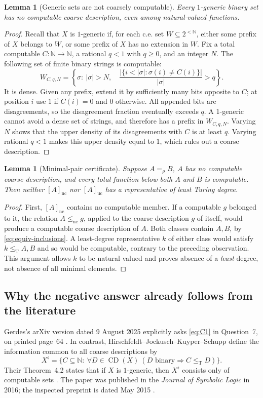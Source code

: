 \documentclass[11pt,a4paper]{article}
\newcommand{\N}{\mathbb N}
\newcommand{\strings}{2^{<\N}}
\newcommand{\leT}{\leq_{\mathrm T}}
\newcommand{\CD}{\operatorname{CD}}
\newcommand{\nc}{\mathrm{nc}}
\newcommand{\uc}{\mathrm{uc}}
\newtheorem{lemma}[theorem]{Lemma}
\theoremstyle{definition}\newtheorem{definition}[theorem]{Definition}
\theoremstyle{remark}\newtheorem{remark}[theorem]{Remark}
\begin{document}
\begin{lemma}[Generic sets are not coarsely computable]\label{lem:generic}
Every $1$-generic binary set has no computable coarse description, even among
natural-valued functions.
\end{lemma}
\begin{proof}
Recall that $X$ is $1$-generic if, for each c.e. set $W\subseteq\strings$,
either some prefix of $X$ belongs to $W$, or some prefix of $X$ has no
extension in $W$.
Fix a total computable $C:\N\to\N$, a rational $q<1$ with $q\ge0$, and an
integer $N$. The following set of finite binary strings is computable:
\[
 W_{C,q,N}=\left\{\sigma:\ |\sigma|>N,
 \quad\frac{|\{i<|\sigma|:\sigma(i)\ne C(i)\}|}{|\sigma|}>q\right\}.
\]
It is dense. Given any prefix, extend it by sufficiently many bits opposite
to $C$; at position $i$ use $1$ if $C(i)=0$ and $0$ otherwise. All appended
bits are disagreements, so the disagreement fraction eventually exceeds $q$.
A $1$-generic cannot avoid a dense set of strings, and therefore has a prefix
in $W_{C,q,N}$. Varying $N$ shows that the upper density of its disagreements
with $C$ is at least $q$. Varying rational $q<1$ makes this upper density equal
to $1$, which rules out a coarse description.
\end{proof}

\begin{lemma}[Minimal-pair certificate]\label{lem:certificate}
Suppose $A=_{\rho}B$, $A$ has no computable coarse description, and every total
function below both $A$ and $B$ is computable. Then neither $[A]_{\nc}$ nor
$[A]_{\uc}$ has a representative of least Turing degree.
\end{lemma}
\begin{proof}
First, $[A]_{\nc}$ contains no computable member. If a computable $g$ belonged
to it, the relation $A\leq_{\nc}g$, applied to the coarse description $g$ of
itself, would produce a computable coarse description of $A$.
Both classes contain $A,B$, by \eqref{eq:equiv-inclusions}. A least-degree
representative $k$ of either class would satisfy $k\leT A,B$ and so would be
computable, contrary to the preceding observation. This argument allows $k$
to be natural-valued and proves absence of a \emph{least} degree, not absence
of all minimal elements.
\end{proof}

\subsection{Why the negative answer already follows from the literature}
Gerdes's arXiv version dated 9 August 2025 explicitly asks
\eqref{eq:C1} in Question~7, on printed page~64 \cite{Gerdes}.
In contrast, Hirschfeldt--Jockusch--Kuyper--Schupp define the information common
to all coarse descriptions by
\[
 X^{\mathfrak c}=
 \{C\subseteq\N:\ \forall D\in\CD(X)\ (D\text{ binary}\Rightarrow C\leT D)\}.
\]
Their Theorem~4.2 states that if $X$ is $1$-generic, then $X^{\mathfrak c}$
consists only of computable sets \cite[Theorem~4.2]{HJKS}.
The paper was published in the \emph{Journal of Symbolic Logic} in 2016;
the inspected preprint is dated May 2015 \cite{HJKS}.
\end{document}
